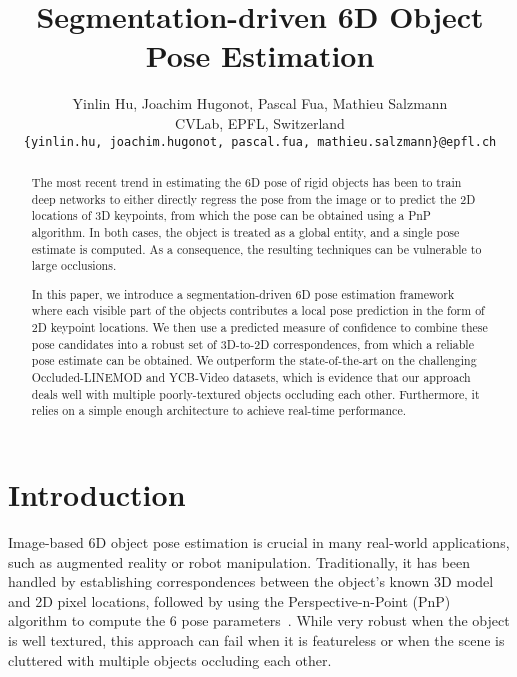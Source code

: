 \documentclass[10pt,twocolumn,letterpaper]{article}
\begin{document}
\title{Segmentation-driven 6D Object Pose Estimation}

\author{
  \vspace{0.5em}
  {Yinlin Hu, \quad Joachim Hugonot, \quad Pascal Fua, \quad Mathieu Salzmann} \\
  {CVLab, EPFL, Switzerland} \\
  {\tt\small \{yinlin.hu, joachim.hugonot, pascal.fua, mathieu.salzmann\}@epfl.ch} \\
}

\maketitle
\thispagestyle{empty}



\begin{abstract}

The most recent trend in estimating the 6D pose of rigid objects has been to train deep networks to either directly regress the pose from the image or to predict the 2D locations of 3D keypoints, from which the pose can be obtained using a PnP algorithm. In both cases, the object is treated as a global entity, and a single pose estimate is computed. As a consequence, the resulting techniques can be vulnerable to large occlusions. 

In this paper, we introduce a segmentation-driven 6D pose estimation framework where each visible part of the objects contributes a local pose prediction in the form of 2D keypoint locations. We then use a predicted measure of confidence to combine these pose candidates into a robust set of 3D-to-2D correspondences, from which a reliable pose estimate can be obtained. We outperform the state-of-the-art on the challenging Occluded-LINEMOD and YCB-Video datasets, which is evidence that our approach deals well with multiple poorly-textured objects occluding each other. Furthermore, it relies on a simple enough architecture to achieve real-time performance.


\end{abstract} 

\section{Introduction}

Image-based 6D object pose estimation is crucial in many real-world applications, such as augmented reality or robot manipulation. Traditionally, it has been handled by establishing correspondences between the object's known 3D model and 2D pixel locations, followed by using the Perspective-n-Point (PnP) algorithm to compute the 6 pose parameters~\cite{Lepetit05b,Rothganger06,Wagner08}. While very robust when the object is well textured, this approach can fail when it is featureless or when the scene is cluttered with multiple objects occluding each other. 
\end{document}
